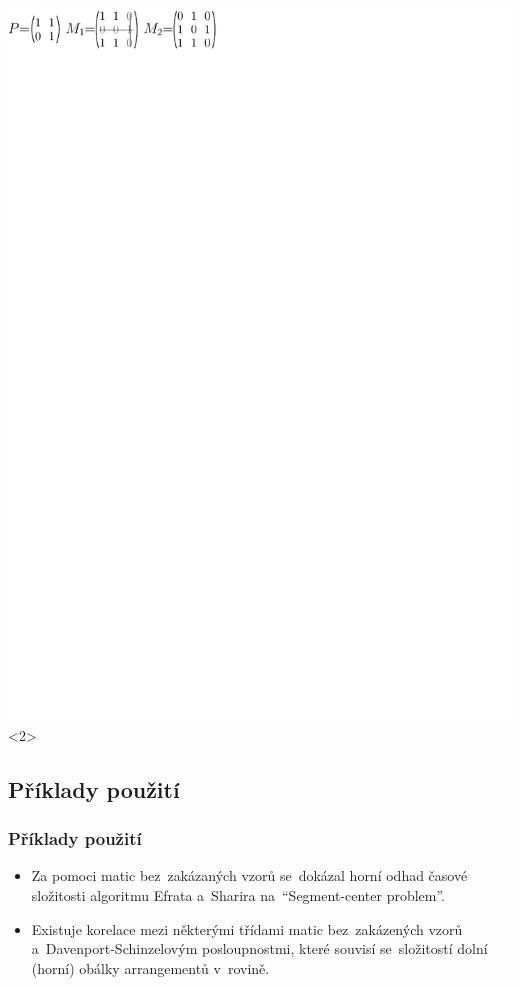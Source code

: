\documentclass{beamer}
\begin{document}
\begin{frame}
\includegraphics{../img/example2.pdf}<2>
\end{frame}

\subsection{Příklady použití}
\begin{frame}
\frametitle{Příklady použití}
\begin{itemize}
\setlength\itemsep{3mm}
\item Za pomoci matic bez~zakázaných vzorů se~dokázal horní odhad časové složitosti algoritmu Efrata a~Sharira na~``Segment-center problem''.
\item Existuje korelace mezi některými třídami matic bez~zakázených vzorů a~Davenport-Schinzelovým posloupnostmi, které souvisí se~složitostí dolní (horní) obálky arrangementů v~rovině.
\end{itemize}
\end{frame}
\end{document}
